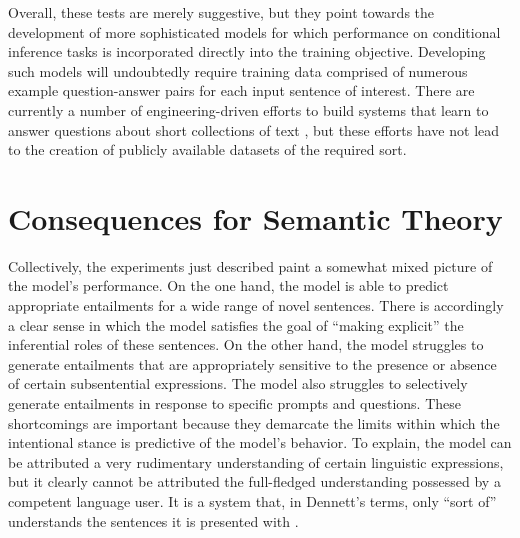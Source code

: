 Overall, these tests are merely suggestive, but they point towards the development of more sophisticated models for which performance on conditional inference tasks is incorporated directly into the training objective. Developing such models will undoubtedly require training data comprised of numerous example question-answer pairs for each input sentence of interest. There are currently a number of engineering-driven efforts to build systems that learn to answer questions about short collections of text \citep[e.g.,][]{Weston:2015,Weston:2016,Sukhbataar:2015}, but these efforts have not lead to the creation of publicly available datasets of the required sort.

\section{Consequences for Semantic Theory}\label{sec:consequences}

Collectively, the experiments just described paint a somewhat mixed picture of the model's performance. On the one hand, the model is able to predict appropriate entailments for a wide range of novel sentences. There is accordingly a clear sense in which the model satisfies the goal of ``making explicit'' the inferential roles of these sentences. On the other hand, the model struggles to generate entailments that are appropriately sensitive to the presence or absence of certain subsentential expressions. The model also struggles to selectively generate entailments in response to specific prompts and questions. These shortcomings are important because they demarcate the limits within which the intentional stance is predictive of the model's behavior. To explain, the model can be attributed a very rudimentary understanding of certain linguistic expressions, but it clearly cannot be attributed the full-fledged understanding possessed by a competent language user. It is a system that, in Dennett's terms, only ``sort of'' understands the sentences it is presented with \citep[qtd. in][]{Rothman:2017}.

